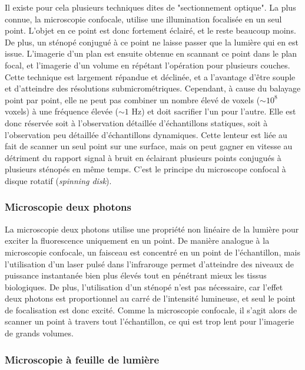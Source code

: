 Il existe pour cela plusieurs techniques dites de "sectionnement optique". La plus connue, la microscopie confocale, utilise une illumination focalisée en un seul point. L'objet en ce point est donc fortement éclairé, et le reste beaucoup moins. De plus, un sténopé conjugué à ce point ne laisse passer que la lumière qui en est issue. L'imagerie d'un plan est ensuite obtenue en scannant ce point dans le plan focal, et l'imagerie d'un volume en répétant l'opération pour plusieurs couches. Cette technique est largement répandue et déclinée, et a l'avantage d'être souple et d'atteindre des résolutions submicrométriques. Cependant, à cause du balayage point par point, elle ne peut pas combiner un nombre élevé de voxels ($\sim 10^8$ voxels) à une fréquence élevée ($\sim 1$ Hz) et doit sacrifier l'un pour l'autre. Elle est donc réservée soit à l'observation détaillée d'échantillons statiques, soit à l'observation peu détaillée d'échantillons dynamiques. Cette lenteur est liée au fait de scanner un seul point sur une surface, mais on peut gagner en vitesse au détriment du rapport signal à bruit en éclairant plusieurs points conjugués à plusieurs sténopés en même temps. C'est le principe du microscope confocal à disque rotatif (\emph{spinning disk}).


\subsubsection{Microscopie deux photons}

La microscopie deux photons utilise une propriété non linéaire de la lumière pour exciter la fluorescence uniquement en un point. De manière analogue à la microscopie confocale, un faisceau est concentré en un point de l'échantillon, mais l'utilisation d'un laser pulsé dans l'infrarouge permet d'atteindre des niveaux de puissance instantanée bien plus élevés tout en pénétrant mieux les tissus biologiques. De plus, l'utilisation d'un sténopé n'est pas nécessaire, car l'effet deux photons est proportionnel au carré de l'intensité lumineuse, et seul le point de focalisation est donc excité. Comme la microscopie confocale, il s'agit alors de scanner un point à travers tout l'échantillon, ce qui est trop lent pour l'imagerie de grands volumes.  

\subsubsection{Microscopie à feuille de lumière}

